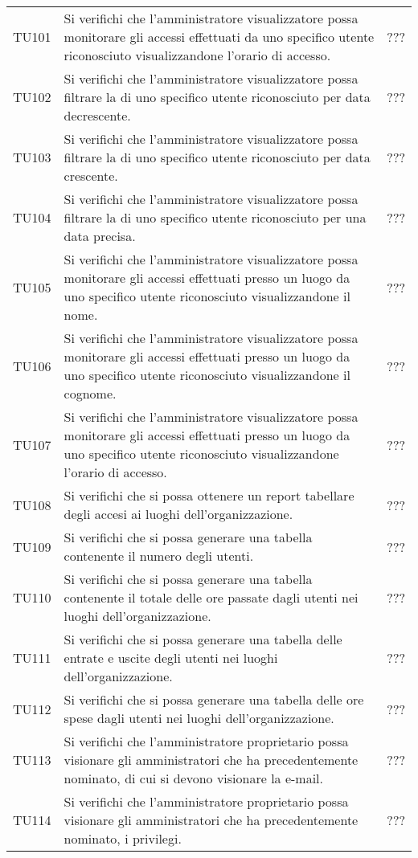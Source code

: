 {\begin{longtable}{ c C{13cm} C{1cm}}
TU101 & Si verifichi che l’amministratore visualizzatore possa monitorare gli accessi effettuati da uno specifico utente riconosciuto visualizzandone l’orario di accesso. & ??? \\
TU102 & Si verifichi che l’amministratore visualizzatore possa filtrare la  di uno specifico utente riconosciuto per data decrescente. & ??? \\
TU103 & Si verifichi che l’amministratore visualizzatore possa filtrare la  di uno specifico utente riconosciuto per data crescente. & ??? \\
TU104 & Si verifichi che l’amministratore visualizzatore possa filtrare la  di uno specifico utente riconosciuto per una data precisa. & ??? \\
TU105 & Si verifichi che l’amministratore visualizzatore possa monitorare gli accessi effettuati presso un luogo da uno specifico utente riconosciuto visualizzandone il nome. & ??? \\
TU106 & Si verifichi che l’amministratore visualizzatore possa monitorare gli accessi effettuati presso un luogo da uno specifico utente riconosciuto visualizzandone il cognome. & ??? \\
TU107 & Si verifichi che l’amministratore visualizzatore possa monitorare gli accessi effettuati presso un luogo da uno specifico utente riconosciuto visualizzandone l’orario di accesso. & ??? \\
TU108 & Si verifichi che si possa ottenere un report tabellare degli accesi ai luoghi dell'organizzazione. & ??? \\
TU109 & Si verifichi che si possa generare una tabella contenente il numero degli utenti. & ??? \\
TU110 & Si verifichi che si possa generare una tabella contenente il totale delle ore passate dagli utenti nei luoghi dell’organizzazione. & ??? \\
TU111 & Si verifichi che si possa generare una tabella delle entrate e uscite degli utenti nei luoghi dell'organizzazione. & ??? \\
TU112 & Si verifichi che si possa generare una tabella delle ore spese dagli utenti nei luoghi dell'organizzazione. & ??? \\
TU113 & Si verifichi che l’amministratore proprietario possa visionare gli amministratori che ha precedentemente nominato, di cui si devono visionare la e-mail. & ??? \\
TU114 & Si verifichi che l’amministratore proprietario possa visionare gli amministratori che ha precedentemente nominato, i privilegi. & ??? \\

\end{longtable}}
